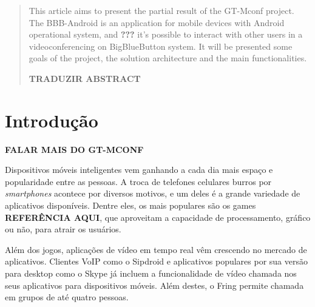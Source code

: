\documentclass{acm_proc_article-sp}
\newcommand{\todo}[1]{\textcolor[rgb]{1.00,0.00,0.00}{\bf \uppercase{#1}}}
\begin{document}
\begin{abstract}
  This article aims to present the partial result of the GT-Mconf project. The BBB-Android is an application for mobile devices with Android operational system, and \todo{???} it's possible to interact with other users in a videoconferencing on BigBlueButton system. It will be presented some goals of the project, the solution architecture and the main functionalities.

\todo{traduzir abstract}
\end{abstract}






\section{Introdução}

\todo{falar mais do GT-Mconf}

Dispositivos móveis inteligentes vem ganhando a cada dia mais espaço e popularidade entre as pessoas. A troca de telefones celulares burros por \emph{smartphones} acontece por diversos motivos, e um deles é a grande variedade de aplicativos disponíveis. Dentre eles, os mais populares são os games \todo{referência aqui}, que aproveitam a capacidade de processamento, gráfico ou não, para atrair os usuários.

Além dos jogos, aplicações de vídeo em tempo real vêm crescendo no mercado de aplicativos. Clientes VoIP como o Sipdroid e aplicativos populares por sua versão para desktop como o Skype já incluem a funcionalidade de vídeo chamada nos seus aplicativos para dispositivos móveis. Além destes, o Fring permite chamada em grupos de até quatro pessoas.
\end{document}
